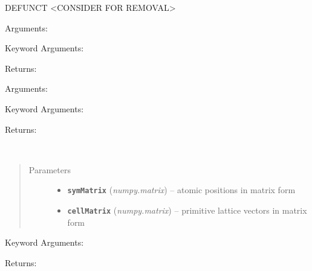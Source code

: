 \documentclass[letterpaper,10pt,english]{sphinxmanual}
\begin{document}

\begin{fulllineitems}
\label{retr:retr.ibrav2String}
DEFUNCT \textless{}CONSIDER FOR REMOVAL\textgreater{}

Arguments:

Keyword Arguments:

Returns:

\end{fulllineitems}


\begin{fulllineitems}
\label{retr:retr.inputDict2params}
Arguments:

Keyword Arguments:

Returns:

\end{fulllineitems}


\begin{fulllineitems}
\label{retr:retr.invertX}~\begin{quote}\begin{description}
\item[{Parameters}] \leavevmode\begin{itemize}
\item {} 
\textbf{\texttt{symMatrix}} (\emph{numpy.matrix}) -- atomic positions in matrix form

\item {} 
\textbf{\texttt{cellMatrix}} (\emph{numpy.matrix}) -- primitive lattice vectors in matrix form

\end{itemize}

\end{description}\end{quote}

Keyword Arguments:

Returns:

\end{fulllineitems}
\end{document}
